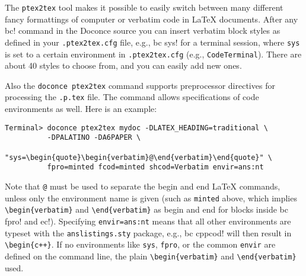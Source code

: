\documentclass[twoside]{article}
\begin{document}
\noindent
The {\fontsize{10pt}{10pt}\verb!ptex2tex!} tool makes it possible to easily switch between many
different fancy formattings of computer or verbatim code in {\LaTeX}
documents. After any {\fontsize{10pt}{10pt}\verb!!bc!} command in the Doconce source you can
insert verbatim block styles as defined in your {\fontsize{10pt}{10pt}\verb!.ptex2tex.cfg!}
file, e.g., {\fontsize{10pt}{10pt}\verb!!bc sys!} for a terminal session, where {\fontsize{10pt}{10pt}\verb!sys!} is set to
a certain environment in {\fontsize{10pt}{10pt}\verb!.ptex2tex.cfg!} (e.g., {\fontsize{10pt}{10pt}\verb!CodeTerminal!}).
There are about 40 styles to choose from, and you can easily add
new ones.

Also the {\fontsize{10pt}{10pt}\verb!doconce ptex2tex!} command supports preprocessor directives
for processing the {\fontsize{10pt}{10pt}\verb!.p.tex!} file. The command allows specifications
of code environments as well. Here is an example:
\vspace{4pt}
\begin{Verbatim}[numbers=none,frame=lines,label=\fbox{{\tiny Terminal}},fontsize=\fontsize{9pt}{9pt},
labelposition=topline,framesep=2.5mm,framerule=0.7pt]
Terminal> doconce ptex2tex mydoc -DLATEX_HEADING=traditional \
          -DPALATINO -DA6PAPER \
          "sys=\begin{quote}\begin{verbatim}@\end{verbatim}\end{quote}" \
          fpro=minted fcod=minted shcod=Verbatim envir=ans:nt
\end{Verbatim}
Note that {\fontsize{10pt}{10pt}\verb!@!} must be used to separate the begin and end {\LaTeX}
commands, unless only the environment name is given (such as {\fontsize{10pt}{10pt}\verb!minted!}
above, which implies {\fontsize{10pt}{10pt}\verb!\begin{verbatim}!} and {\fontsize{10pt}{10pt}\verb!\end{verbatim}!} as
begin and end for blocks inside {\fontsize{10pt}{10pt}\verb!!bc fpro!} and {\fontsize{10pt}{10pt}\verb!!ec!}).  Specifying
{\fontsize{10pt}{10pt}\verb!envir=ans:nt!} means that all other environments are typeset with the
{\fontsize{10pt}{10pt}\verb!anslistings.sty!} package, e.g., {\fontsize{10pt}{10pt}\verb!!bc cppcod!} will then result in
{\fontsize{10pt}{10pt}\verb!\begin{c++}!}. If no environments like {\fontsize{10pt}{10pt}\verb!sys!}, {\fontsize{10pt}{10pt}\verb!fpro!}, or the common
{\fontsize{10pt}{10pt}\verb!envir!} are defined on the command line, the plain {\fontsize{10pt}{10pt}\verb!\begin{verbatim}!}
and {\fontsize{10pt}{10pt}\verb!\end{verbatim}!} used.
\end{document}
